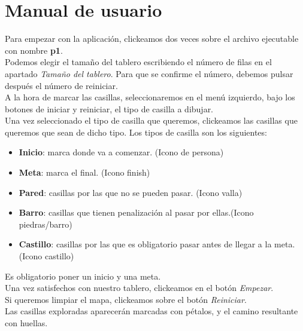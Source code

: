 \documentclass[12pt]{article}
\begin{document}
\section{Manual de usuario}
Para empezar con la aplicación, clickeamos dos veces sobre el archivo ejecutable con nombre \textbf{p1}.\\
Podemos elegir el tamaño del tablero escribiendo el número de filas en el apartado\textit{ Tamaño del tablero}. Para que se confirme el número, debemos pulsar después el número de reiniciar.\\
A la hora de marcar las casillas, seleccionaremos en el menú izquierdo, bajo los botones de iniciar y reiniciar, el tipo de casilla a dibujar.\\
Una vez seleccionado el tipo de casilla que queremos, clickeamos las casillas que queremos que sean de dicho tipo. Los tipos de casilla son los siguientes:\\
\begin{itemize}
    \item \textbf{Inicio}: marca donde va a comenzar. (Icono de persona)
    \item \textbf{Meta}: marca el final. (Icono finish)
    \item \textbf{Pared}: casillas por las que no se pueden pasar. (Icono valla)
    \item \textbf{Barro}: casillas que tienen penalización al pasar por ellas.(Icono piedras/barro)
    \item \textbf{Castillo}: casillas por las que es obligatorio pasar antes de llegar a la meta. (Icono castillo)
\end{itemize}
Es obligatorio poner un inicio y una meta.\\
Una vez satisfechos con nuestro tablero, clickeamos en el botón \textit{Empezar}.\\
Si queremos limpiar el mapa, clickeamos sobre el botón \textit{Reiniciar}.\\
Las casillas exploradas aparecerán marcadas con pétalos, y el camino resultante con huellas.
\end{document}
